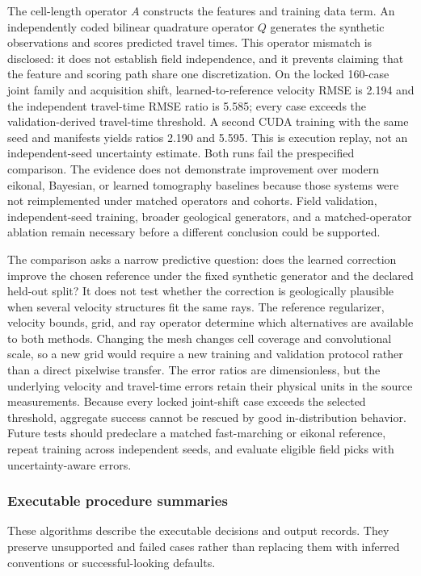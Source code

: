 The cell-length operator $A$ constructs the features and training data
term. An independently coded bilinear quadrature operator $Q$ generates
the synthetic observations and scores predicted travel times. This
operator mismatch is disclosed: it does not establish field
independence, and it prevents claiming that the feature and scoring path
share one discretization. On the locked 160-case joint family and
acquisition shift, learned-to-reference velocity RMSE is 2.194 and the
independent travel-time RMSE ratio is 5.585; every case exceeds the
validation-derived travel-time threshold. A second CUDA training with
the same seed and manifests yields ratios 2.190 and 5.595. This is
execution replay, not an independent-seed uncertainty estimate. Both
runs fail the prespecified comparison. The evidence does not demonstrate
improvement over modern eikonal, Bayesian, or learned tomography
baselines because those systems were not reimplemented under matched
operators and cohorts. Field validation, independent-seed training,
broader geological generators, and a matched-operator ablation remain
necessary before a different conclusion could be supported.


The comparison asks a narrow predictive question: does the learned
correction improve the chosen reference under the fixed synthetic
generator and the declared held-out split? It does not test whether the
correction is geologically plausible when several velocity structures
fit the same rays. The reference regularizer, velocity bounds, grid, and
ray operator determine which alternatives are available to both methods.
Changing the mesh changes cell coverage and convolutional scale, so a
new grid would require a new training and validation protocol rather
than a direct pixelwise transfer. The error ratios are dimensionless,
but the underlying velocity and travel-time errors retain their physical
units in the source measurements. Because every locked joint-shift case
exceeds the selected threshold, aggregate success cannot be rescued by
good in-distribution behavior. Future tests should predeclare a matched
fast-marching or eikonal reference, repeat training across independent
seeds, and evaluate eligible field picks with uncertainty-aware errors.

\subsubsection{Executable procedure summaries}

These algorithms describe the executable decisions and output records.
They preserve unsupported and failed cases rather than replacing them
with inferred conventions or successful-looking defaults.

